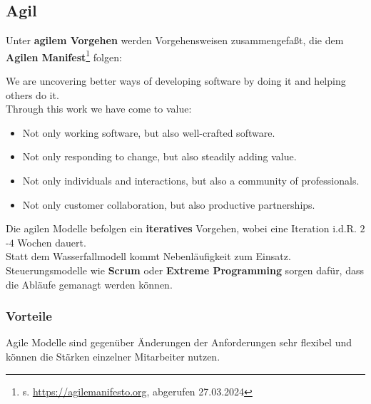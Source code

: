 \subsection{Agil}

\noindent
Unter \textbf{agilem Vorgehen} werden Vorgehensweisen zusammengefaßt, die dem \textbf{Agilen Manifest}\footnote{
    s. \url{https://agilemanifesto.org}, abgerufen 27.03.2024
} folgen:

\begin{tcolorbox}[title=Manifesto for Agile Software Development]
    We are uncovering better ways of developing software by doing it and helping others do it.\\
    Through this work we have come to value:
    \begin{itemize}
        \item Not only working software, but also well-crafted software.
        \item Not only responding to change, but also steadily adding value.
        \item Not only individuals and interactions, but also a community of professionals.
        \item Not only customer collaboration, but also productive partnerships.
        \end{itemize}
\end{tcolorbox}

\noindent
Die agilen Modelle befolgen ein \textbf{iteratives} Vorgehen, wobei eine Iteration i.d.R. $2$-$4$ Wochen dauert.\\
Statt dem Wasserfallmodell kommt Nebenläufigkeit zum Einsatz.\\
Steuerungsmodelle wie \textbf{Scrum} oder \textbf{Extreme Programming} sorgen dafür, dass die Abläufe gemanagt werden können.

\subsubsection*{Vorteile}
Agile Modelle sind gegenüber Änderungen der Anforderungen sehr flexibel und können die Stärken einzelner Mitarbeiter nutzen.